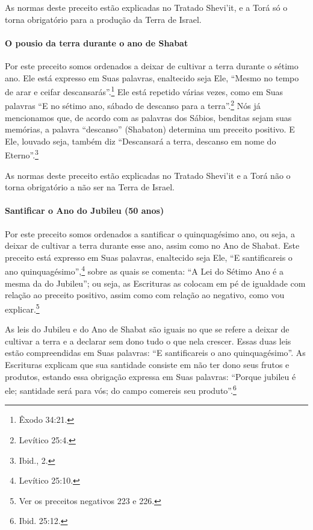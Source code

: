 \begin{multicols}{2}
As normas deste preceito estão explicadas no Tratado Shevi'it\starr, e a Torá\starr{}
só o torna obrigatório para a produção da Terra de Israel.

\paragraph{O pousio da terra durante o ano de Shabat}

Por este preceito somos ordenados a deixar de cultivar a terra durante
o sétimo ano. Ele está expresso em Suas palavras, enaltecido seja Ele,
``Mesmo no tempo de arar e ceifar descansarás''.\footnote{Êxodo 34:21.} Ele está
repetido várias vezes, como em Suas palavras ``E no sétimo ano, sábado
de descanso para a terra''.\footnote{Levítico 25:4.} Nós já mencionamos que, de
acordo com as palavras dos Sábios, benditas sejam suas memórias, a
palavra ``descanso'' (Shabaton) determina um preceito positivo. E Ele,
louvado seja, também diz ``Descansará a terra, descanso em nome do
Eterno''.\footnote{Ibid., 2.}

As normas deste preceito estão explicadas no Tratado Shevi'it\starr{} e a Torá\starr{}
não o torna obrigatório a não ser na Terra de Israel.

\paragraph{Santificar o Ano do Jubileu (50 anos)}

Por este preceito somos ordenados a santificar o quinquagésimo ano, ou
seja, a deixar de cultivar a terra durante esse ano, assim como no Ano
de Shabat. Este preceito está expresso em Suas palavras, enaltecido seja
Ele, ``E santificareis o ano quinquagésimo'',\footnote{Levítico 25:10.} sobre as
quais se comenta: ``A Lei do Sétimo Ano é a mesma da do Jubileu''; ou
seja, as Escrituras as colocam em pé de igualdade com relação ao preceito positivo, assim como com relação ao negativo, como vou explicar.\footnote{Ver os preceitos negativos 223 e 226.}

As leis do Jubileu e do Ano de Shabat são iguais no que se refere a
deixar de cultivar a terra e a declarar sem dono tudo o que nela crescer. Essas
duas leis estão compreendidas em Suas palavras: ``E santificareis o ano
quinquagésimo''. As Escrituras explicam que sua santidade consiste em
não ter dono seus frutos e produtos, estando essa obrigação expressa em
Suas palavras: ``Porque jubileu é ele; santidade será para vós; do
campo comereis seu produto''.\footnote{Ibid. 25:12.}


\end{multicols}
